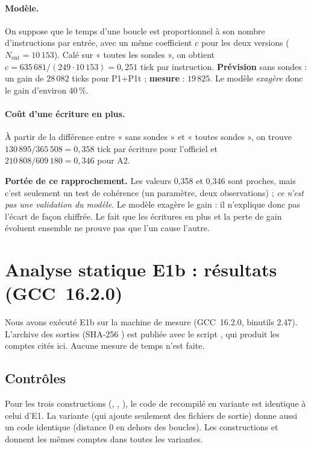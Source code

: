 \paragraph{Modèle.} On suppose que le temps d'une boucle est proportionnel à son nombre d'instructions par entrée, avec un même coefficient $c$ pour les deux versions ($N_{\mathrm{ent}}=10\,153$). Calé sur « toutes les sondes », on obtient $c=635\,681/(249\cdot10\,153)=0{,}251$ tick par instruction. \textbf{Prévision} sans sondes : un gain de $28\,082$ ticks pour P1+P1t ; \textbf{mesure} : $19\,825$. Le modèle \emph{exagère} donc le gain d'environ 40\,\%.

\paragraph{Coût d'une écriture en plus.} À partir de la différence entre « sans sondes » et « toutes sondes », on trouve $130\,895/365\,508=0{,}358$ tick par écriture pour l'officiel et $210\,808/609\,180=0{,}346$ pour A2.

\begin{encadre}
\textbf{Portée de ce rapprochement.} Les valeurs 0,358 et 0,346 sont proches, mais c'est seulement un test de cohérence (un paramètre, deux observations) ; \emph{ce n'est pas une validation du modèle}. Le modèle exagère le gain : il n'explique donc pas l'écart de façon chiffrée. Le fait que les écritures en plus et la perte de gain évoluent ensemble ne prouve pas que l'un cause l'autre.
\end{encadre}

\section[Analyse statique E1b]{Analyse statique E1b : résultats (GCC~16.2.0)}\label{sec:e1b-res}
Nous avons exécuté E1b sur la machine de mesure (GCC~16.2.0, binutils 2.47). L'archive des sorties (SHA-256 ) est publiée avec le script , qui produit les comptes cités ici. Aucune mesure de temps n'est faite.

\subsection{Contrôles}
\F{} Pour les trois constructions (, , ), le code de  recompilé en variante  est identique à celui d'E1. La variante  (qui ajoute seulement des fichiers de sortie) donne aussi un code identique (distance 0 en dehors des boucles). Les constructions  et  donnent les mêmes comptes dans toutes les variantes.

